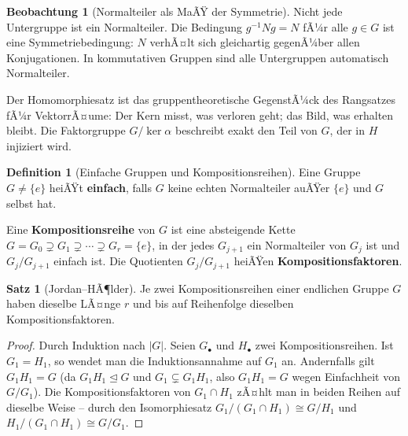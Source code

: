 ﻿\documentclass[a4paper,12pt]{report}
\theoremstyle{definition}
\newtheorem{definition}{Definition}
\newtheorem{satz}{Satz}
\newtheorem{beobachtung}{Beobachtung}
\begin{document}
\begin{beobachtung}[Normalteiler als MaÃŸ der Symmetrie]
    Nicht jede Untergruppe ist ein Normalteiler. Die Bedingung
    $g^{-1}Ng = N$ fÃ¼r alle $g \in G$ ist eine Symmetriebedingung:
    $N$ verhÃ¤lt sich gleichartig gegenÃ¼ber allen Konjugationen.
    In kommutativen Gruppen sind alle Untergruppen automatisch Normalteiler.

    Der Homomorphiesatz ist das gruppentheoretische GegenstÃ¼ck des
    Rangsatzes fÃ¼r VektorrÃ¤ume: Der Kern misst, was verloren geht;
    das Bild, was erhalten bleibt. Die Faktorgruppe $G/\ker\alpha$
    beschreibt exakt den Teil von $G$, der in $H$ injiziert wird.
\end{beobachtung}

\begin{definition}[Einfache Gruppen und Kompositionsreihen]
    Eine Gruppe $G \neq \{e\}$ heiÃŸt \textbf{einfach}, falls $G$ keine
    echten Normalteiler auÃŸer $\{e\}$ und $G$ selbst hat.

    Eine \textbf{Kompositionsreihe} von $G$ ist eine absteigende Kette
    $G = G_0 \supsetneq G_1 \supsetneq \cdots \supsetneq G_r = \{e\}$,
    in der jedes $G_{j+1}$ ein Normalteiler von $G_j$ ist und
    $G_j/G_{j+1}$ einfach ist. Die Quotienten $G_j/G_{j+1}$ heiÃŸen
    \textbf{Kompositionsfaktoren}.
\end{definition}

\begin{satz}[Jordan--HÃ¶lder]
    Je zwei Kompositionsreihen einer endlichen Gruppe $G$ haben dieselbe
    LÃ¤nge $r$ und bis auf Reihenfolge dieselben Kompositionsfaktoren.
\end{satz}
\begin{proof}
    Durch Induktion nach $|G|$. Seien $G_\bullet$ und $H_\bullet$ zwei
    Kompositionsreihen. Ist $G_1 = H_1$, so wendet man die Induktionsannahme
    auf $G_1$ an. Andernfalls gilt $G_1 H_1 = G$ (da $G_1 H_1 \trianglelefteq G$
    und $G_1 \subsetneq G_1 H_1$, also $G_1 H_1 = G$ wegen Einfachheit von $G/G_1$).
    Die Kompositionsfaktoren von $G_1 \cap H_1$ zÃ¤hlt man in beiden
    Reihen auf dieselbe Weise -- durch den Isomorphiesatz
    $G_1/(G_1 \cap H_1) \cong G/H_1$ und $H_1/(G_1 \cap H_1) \cong G/G_1$.
\end{proof}
\end{document}
